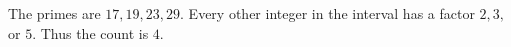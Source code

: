 The primes are $17,19,23,29$. Every other integer in the interval has a factor $2,3,$ or $5$. Thus the count is $\boxed4$.
